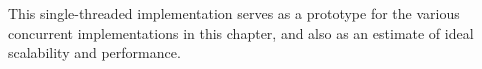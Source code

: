 This single-threaded implementation serves as a prototype for the various
concurrent implementations in this chapter, and also as an estimate of
ideal scalability and performance.
\fi









